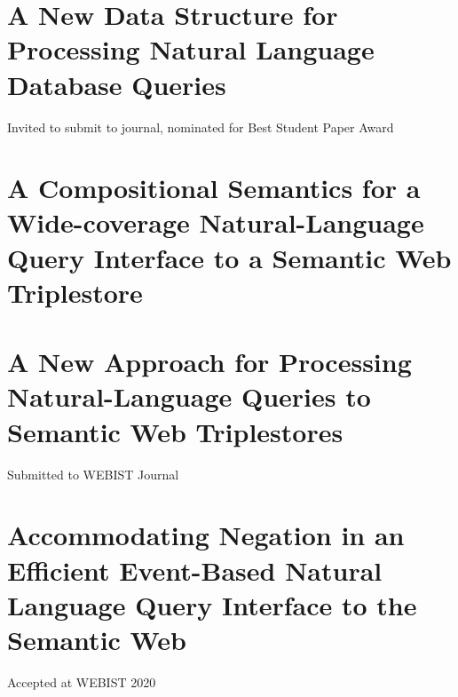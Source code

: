 \documentclass[../main.tex]{subfiles}
\begin{document}
\begin{refsection}
\section{A New Data Structure for Processing Natural Language Database Queries}


Invited to submit to journal, nominated for Best Student Paper Award

\section{A Compositional Semantics for a Wide-coverage Natural-Language Query Interface to a Semantic Web Triplestore}


\section{A New Approach for Processing Natural-Language Queries to Semantic Web Triplestores}


Submitted to WEBIST Journal

\section{Accommodating Negation in an Efficient Event-Based Natural Language Query Interface to the Semantic Web}


Accepted at WEBIST 2020

\printbibliography[heading=subbibintoc]
\end{refsection}
\end{document}
